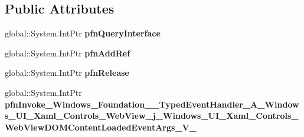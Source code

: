 \subsection*{Public Attributes}
\begin{DoxyCompactItemize}
\item 
\mbox{\label{struct_windows_1_1_foundation_1_1_typed_event_handler___a___windows___u_i___xaml___controls___we5ac43aef74fa54d3107343c3c79b75ac_a0bafe9d5217e602ace9a5e946fd33d76}} 
global\+::\+System.\+Int\+Ptr {\bfseries pfn\+Query\+Interface}
\item 
\mbox{\label{struct_windows_1_1_foundation_1_1_typed_event_handler___a___windows___u_i___xaml___controls___we5ac43aef74fa54d3107343c3c79b75ac_abbdd0c443a8a628c5f19834f660b67f0}} 
global\+::\+System.\+Int\+Ptr {\bfseries pfn\+Add\+Ref}
\item 
\mbox{\label{struct_windows_1_1_foundation_1_1_typed_event_handler___a___windows___u_i___xaml___controls___we5ac43aef74fa54d3107343c3c79b75ac_a24aa6d5d917d74eb02e0ebbaa8b161a2}} 
global\+::\+System.\+Int\+Ptr {\bfseries pfn\+Release}
\item 
\mbox{\label{struct_windows_1_1_foundation_1_1_typed_event_handler___a___windows___u_i___xaml___controls___we5ac43aef74fa54d3107343c3c79b75ac_a18d14f48faeaf57d1ea645c6d82614fc}} 
global\+::\+System.\+Int\+Ptr {\bfseries pfn\+Invoke\+\_\+\+Windows\+\_\+\+Foundation\+\_\+\+\_\+\+Typed\+Event\+Handler\+\_\+\+A\+\_\+\+Windows\+\_\+\+U\+I\+\_\+\+Xaml\+\_\+\+Controls\+\_\+\+Web\+View\+\_\+j\+\_\+\+Windows\+\_\+\+U\+I\+\_\+\+Xaml\+\_\+\+Controls\+\_\+\+Web\+View\+D\+O\+M\+Content\+Loaded\+Event\+Args\+\_\+\+V\+\_\+}
\end{DoxyCompactItemize}
